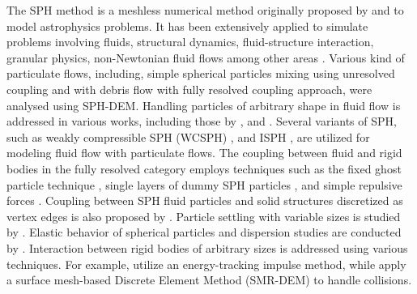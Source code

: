 \documentclass[preprint,12pt]{elsarticle}
\begin{document}
The SPH method is a meshless numerical method originally proposed by
\citet{gingold1977smoothed} and \citet{lucy1977numerical} to model
astrophysics problems. It has been extensively applied to simulate problems
involving fluids, structural dynamics, fluid-structure interaction, granular
physics, non-Newtonian fluid flows \cite{peng2021fully} among other areas
\cite{monaghan2012smoothed}.  Various kind of particulate flows, including,
simple spherical particles mixing using unresolved coupling
\cite{cleary2015prediction, markauskas2019coupled} and with debris flow
\cite{canelas2016sph} with fully resolved coupling approach, were analysed
using SPH-DEM.  Handling particles of arbitrary shape in fluid flow is
addressed in various works, including those by \citet{peng2021fully,
  canelas2016sph}, and \citet{amicarelli2015smoothed}.  Several variants of
SPH, such as weakly compressible SPH (WCSPH) \cite{peng2021fully,
  cleary2015prediction}, and ISPH \cite{asai2021fluid}, are utilized for
modeling fluid flow with particulate flows. The coupling between fluid and
rigid bodies in the fully resolved category employs techniques such as the
fixed ghost particle technique \cite{canelas2016sph, asai2021fluid}, single
layers of dummy SPH particles \cite{peng2021fully}, and simple repulsive
forces \cite{monaghan2009sph}. Coupling between SPH fluid particles and solid
structures discretized as vertex edges is also proposed by
\citet{park2023new}. Particle settling with variable sizes is studied by
\citet{zou2022study}.  Elastic behavior of spherical particles and dispersion
studies are conducted by \citet{ng2021numerical}. Interaction between rigid
bodies of arbitrary sizes is addressed using various techniques. For example,
\citet{asai2021fluid} utilize an energy-tracking impulse method, while
\citet{peng2021fully} apply a surface mesh-based Discrete Element Method
(SMR-DEM) to handle collisions.
\end{document}
